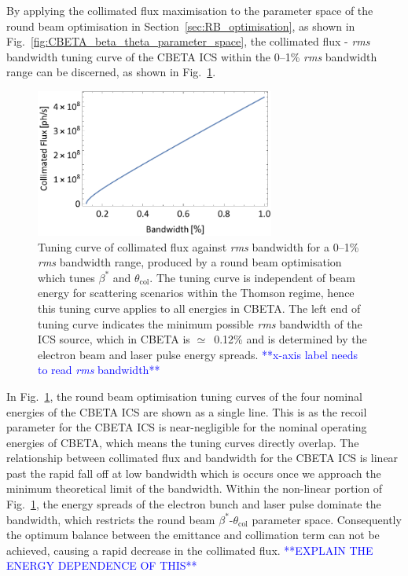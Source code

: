 \documentclass[../main.tex]{subfiles}
\begin{document}
By applying the collimated flux maximisation to the parameter space of the round beam optimisation in Section~\ref{sec:RB_optimisation}, as shown in Fig.~\ref{fig:CBETA_beta_theta_parameter_space}, the collimated flux - \textit{rms} bandwidth tuning curve of the CBETA ICS within the 0--1\% \textit{rms} bandwidth range can be discerned, as shown in Fig.~\ref{fig:CBETA_Tuning_Curve}. 
\begin{figure}[!h]
\centering
\includegraphics[width=0.7\textwidth]{Figures/CBETA_Inverse_Compton_Source_Design/CBETATuningCurve.pdf}
\caption{Tuning curve of collimated flux against \textit{rms} bandwidth for a 0--1\% \textit{rms} bandwidth range, produced by a round beam optimisation which tunes $\beta^{*}$ and $\theta_{\mathrm{col}}$. The tuning curve is independent of beam energy for scattering scenarios within the Thomson regime, hence this tuning curve applies to all energies in CBETA. The left end of tuning curve indicates the minimum possible \textit{rms} bandwidth of the ICS source, which in CBETA is $\simeq$~0.12\% and is determined by the electron beam and laser pulse energy spreads. \textcolor{blue}{**x-axis label needs to read \textit{rms} bandwidth**}}
\label{fig:CBETA_Tuning_Curve}
\end{figure}

In Fig.~\ref{fig:CBETA_Tuning_Curve}, the round beam optimisation tuning curves of the four nominal energies of the CBETA ICS are shown as a single line. This is as the recoil parameter for the CBETA ICS is near-negligible for the nominal operating energies of CBETA, which means the tuning curves directly overlap. The relationship between collimated flux and bandwidth for the CBETA ICS is linear past the rapid fall off at low bandwidth which is occurs once we approach the minimum theoretical limit of the bandwidth. Within the non-linear portion of Fig.~\ref{fig:CBETA_Tuning_Curve}, the energy spreads of the electron bunch and laser pulse dominate the bandwidth, which restricts the round beam $\beta^{*}$-$\theta_{\mathrm{col}}$ parameter space. Consequently the optimum balance between the emittance and collimation term can not be achieved, causing a rapid decrease in the collimated flux.
\textcolor{blue}{**EXPLAIN THE ENERGY DEPENDENCE OF THIS**}
\end{document}
